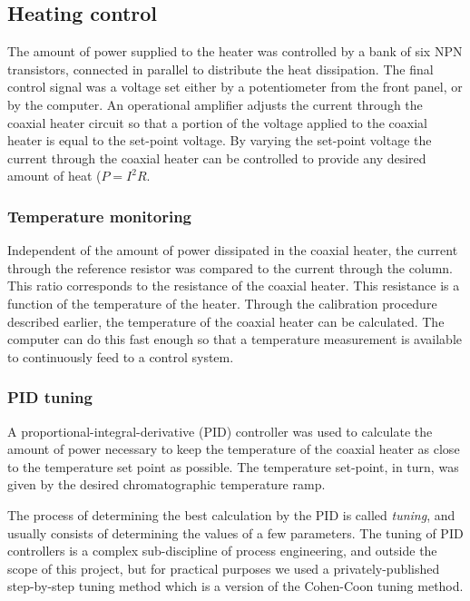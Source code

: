 \subsection{Heating control}

The amount of power supplied to the heater was controlled by a bank of six NPN
transistors, connected in parallel to distribute the heat dissipation. The final
control signal was a voltage set either by a potentiometer from the front panel,
or by the computer. An operational amplifier adjusts the current through the
coaxial heater circuit so that a portion of the voltage applied to the coaxial
heater is equal to the set-point voltage. By varying the set-point voltage the
current through the coaxial heater can be controlled to provide any desired
amount of heat (\(P = I^2R\).

\subsubsection{Temperature monitoring}

Independent of the amount of power dissipated in the coaxial heater, the current
through the reference resistor was compared to the current through the column.
This ratio corresponds to the resistance of the coaxial heater. This resistance
is a function of the temperature of the heater. Through the calibration
procedure described earlier, the temperature of the coaxial heater can be
calculated. The computer can do this fast enough so that a temperature
measurement is available to continuously feed to a control system. 

\subsubsection{PID tuning}

A proportional-integral-derivative (PID) controller was used to calculate the
amount of power necessary to keep the temperature of the coaxial heater as close
to the temperature set point as possible. The temperature set-point, in turn,
was given by the desired chromatographic temperature ramp.

The process of determining the best calculation by the PID is called
\textit{tuning}, and usually consists of determining the values of a few
parameters. The tuning of PID controllers is a complex sub-discipline of process
engineering, and outside the scope of this project, but for practical purposes
we used a privately-published step-by-step tuning method \autocite{Peacock2008}
which is a version of the Cohen-Coon tuning method.

